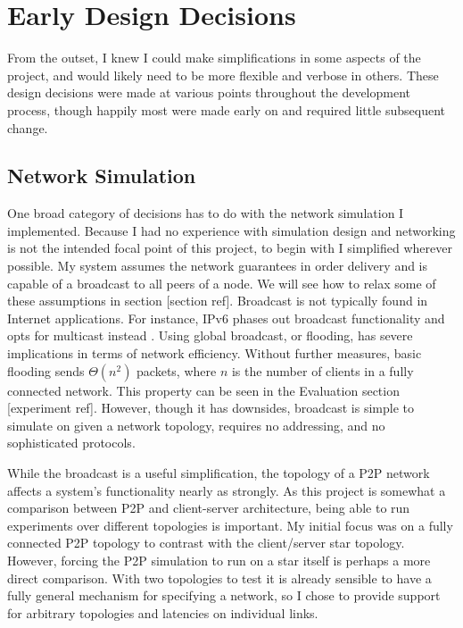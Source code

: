 \documentclass[12pt,a4paper,twoside,openright]{report}
\begin{document}
	
\section{Early Design Decisions}
From the outset, I knew I could make simplifications in some aspects of the project, and would likely need to be more flexible and verbose in others. These design decisions were made at various points throughout the development process, though happily most were made early on and required little subsequent change. 

	\subsection{Network Simulation}
	One broad category of decisions has to do with the network simulation I implemented. Because I had no experience with simulation design and networking is not the intended focal point of this project, to begin with I simplified wherever possible. My system assumes the network guarantees in order delivery and is capable of a broadcast to all peers of a node. We will see how to relax some of these assumptions in section [section ref]. Broadcast is not typically found in Internet applications. For instance, IPv6 phases out broadcast functionality and opts for multicast instead \cite{RFC2460}. Using global broadcast, or flooding, has severe implications in terms of network efficiency. Without further measures, basic flooding sends $\Theta (n^{2})$ packets, where $n$ is the number of clients in a fully connected network. This property can be seen in the Evaluation  section [experiment ref]. However, though it has downsides, broadcast is simple to simulate on given a network topology, requires no addressing, and no sophisticated protocols.
	
	While the broadcast is a useful simplification, the topology of a P2P network affects a system's functionality nearly as strongly. As this project is somewhat a comparison between P2P and client-server architecture, being able to run experiments over different topologies is important. My initial focus was on a fully connected P2P topology to contrast with the client/server star topology. However, forcing the P2P simulation to run on a star itself is perhaps a more direct comparison. With two topologies to test it is already sensible to have a fully general mechanism for specifying a network, so I chose to provide support for arbitrary topologies and latencies on individual links. 
	
\end{document}
